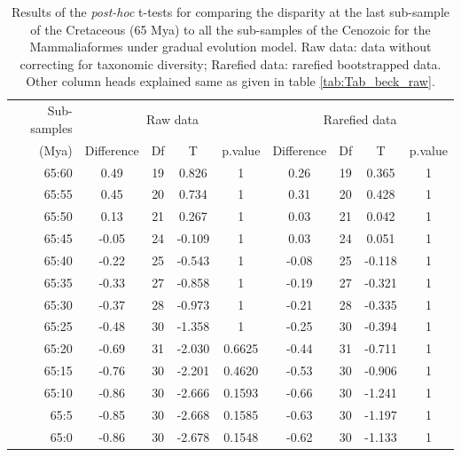 \documentclass[12pt,letterpaper]{article}
\begin{document}
\begin{table}[ht]
\caption{Results of the \textit{post-hoc} t-tests for comparing the disparity at the last sub-sample of the Cretaceous (65 Mya) to all the sub-samples of the Cenozoic for the Mammaliaformes \citep[data from][]{Slater2012MEE} under gradual evolution model. Raw data: data without correcting for taxonomic diversity; Rarefied data: rarefied bootstrapped data. Other column heads explained same as given in table \ref{tab:Tab_beck_raw}.}
\label{tab:Tab_slater}
\centering
\begin{tabular}{r|cccc|cccc}
  \hline
  Sub-samples & \multicolumn{4}{c|}{Raw data} & \multicolumn{4}{c}{Rarefied data} \\
  (Mya) & Difference & Df & T & p.value & Difference & Df & T & p.value \\ 
  \hline
  65:60 & 0.49  & 19 & 0.826  & 1      & 0.26  & 19 & 0.365  & 1 \\ 
  65:55 & 0.45  & 20 & 0.734  & 1      & 0.31  & 20 & 0.428  & 1 \\ 
  65:50 & 0.13  & 21 & 0.267  & 1      & 0.03  & 21 & 0.042  & 1 \\ 
  65:45 & -0.05 & 24 & -0.109 & 1      & 0.03  & 24 & 0.051  & 1 \\ 
  65:40 & -0.22 & 25 & -0.543 & 1      & -0.08 & 25 & -0.118 & 1 \\ 
  65:35 & -0.33 & 27 & -0.858 & 1      & -0.19 & 27 & -0.321 & 1 \\ 
  65:30 & -0.37 & 28 & -0.973 & 1      & -0.21 & 28 & -0.335 & 1 \\ 
  65:25 & -0.48 & 30 & -1.358 & 1      & -0.25 & 30 & -0.394 & 1 \\ 
  65:20 & -0.69 & 31 & -2.030 & 0.6625 & -0.44 & 31 & -0.711 & 1 \\ 
  65:15 & -0.76 & 30 & -2.201 & 0.4620 & -0.53 & 30 & -0.906 & 1 \\ 
  65:10 & -0.86 & 30 & -2.666 & 0.1593 & -0.66 & 30 & -1.241 & 1 \\ 
  65:5  & -0.85 & 30 & -2.668 & 0.1585 & -0.63 & 30 & -1.197 & 1 \\ 
  65:0  & -0.86 & 30 & -2.678 & 0.1548 & -0.62 & 30 & -1.133 & 1 \\ 
   \hline
\end{tabular}
\end{table}

%
%
\end{document}
